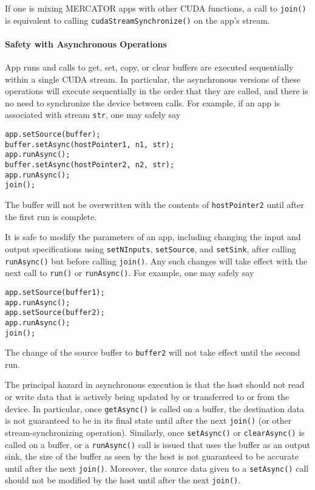 \documentclass[11pt]{article}
\begin{document}
If one is mixing MERCATOR apps with other CUDA functions, a call to
\texttt{join()} is equivalent to calling
\texttt{cudaStreamSynchronize()} on the app's stream.

\paragraph*{Safety with Asynchronous Operations}

App runs and calls to get, set, copy, or clear buffers are executed
sequentially within a single CUDA stream.  In particular, the
asynchronous versions of these operations will execute sequentially in
the order that they are called, and there is no need to synchronize
the device between calls.  For example, if an app is associated
with stream \texttt{str}, one may safely say
\begin{verbatim}
app.setSource(buffer);
buffer.setAsync(hostPointer1, n1, str);
app.runAsync();
buffer.setAsync(hostPointer2, n2, str);
app.runAsync();
join();
\end{verbatim}
The buffer will not be overwritten with the contents of
\texttt{hostPointer2} until after the first run is complete.

It is safe to modify the parameters of an app, including changing the
input and output specifications using \texttt{setNInputs},
\texttt{setSource}, and \texttt{setSink}, after calling
\texttt{runAsync()} but before calling \texttt{join()}.  Any such
changes will take effect with the next call to \texttt{run()} or
\texttt{runAsync()}.  For example, one may safely say
\begin{verbatim}
app.setSource(buffer1);
app.runAsync();
app.setSource(buffer2);
app.runAsync();
join();
\end{verbatim}
The change of the source buffer to \texttt{buffer2} will not take
effect until the second run.

The principal hazard in asynchronous execution is that the host should
not read or write data that is actively being updated by or
transferred to or from the device.  In particular, once
\texttt{getAsync()} is called on a buffer, the destination data is not
guaranteed to be in its final state until after the next
\texttt{join()} (or other stream-synchronizing operation).  Similarly,
once \texttt{setAsync()} or \texttt{clearAsync()} is called on a
buffer, or a \texttt{runAsync()} call is issued that uses the buffer
as an output sink, the size of the buffer as seen by the host is not
guaranteed to be accurate until after the next \texttt{join()}.
Moreover, the source data given to a \texttt{setAsync()} call should
not be modified by the host until after the next \texttt{join()}.
\end{document}
